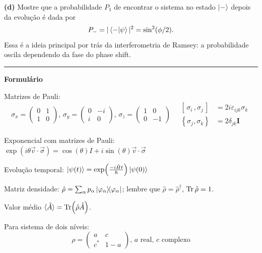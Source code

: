 \documentclass[12pt]{article}
\begin{document}
\textbf{(d)} Mostre que a probabilidade $P_1$ de encontrar o sistema no estado $\ket{-}$ depois da evolução é dada por
\[
P_- = |\bra{-}\ket{\psi}|^2 = \sin^2(\phi/2).
\]
Essa é a ideia principal por trás da interferometria de Ramsey: a probabilidade oscila
dependendo da fase do phase shift.

\vfill
\par\noindent\rule{\textwidth}{0.4pt}

\textbf{Formulário}

Matrizes de Pauli:
\[
\sigma_x = \begin{pmatrix}0&1\\1&0\end{pmatrix},\,
\sigma_y = \begin{pmatrix}0&-i\\i&0\end{pmatrix},\,
\sigma_z = \begin{pmatrix}1&0\\0&-1\end{pmatrix}\quad
\begin{aligned}
\left[\,\sigma_{i}\,, \sigma_{j}\,\right]&=2 i \varepsilon_{i j k} \sigma_{k}\\
\left\{\sigma_{j}, \sigma_{k}\right\}&=2 \delta_{j k}\mathbf{I}
\end{aligned}
\]

Exponencial com matrizes de Pauli: $\exp (i \theta \vec{v} \cdot \vec{\sigma})=\cos (\theta) I+i \sin (\theta) \vec{v} \cdot \vec{\sigma}$

Evolução temporal: $\ket{\psi(t)} = \exp(\frac{-i\hat{H}t}{\hbar}) \ket{\psi(0)}$

Matriz densidade: $\hat{\rho} = \sum_\alpha p_\alpha\op{\varphi_\alpha}{\varphi_\alpha}$; lembre que $\hat{\rho}=\hat{\rho}^{\dagger}$, $\Tr\hat{\rho} = 1$.

Valor médio $\!\ev*{\hat{A}}=\Tr(\hat{\rho}\hat{A})$.

Para sistema de dois níveis:
\[\rho = 
\begin{pmatrix}
a & c\\c^*& 1-a
\end{pmatrix},\,a\text{ real},\,c\text{ complexo}
\]
\end{document}
